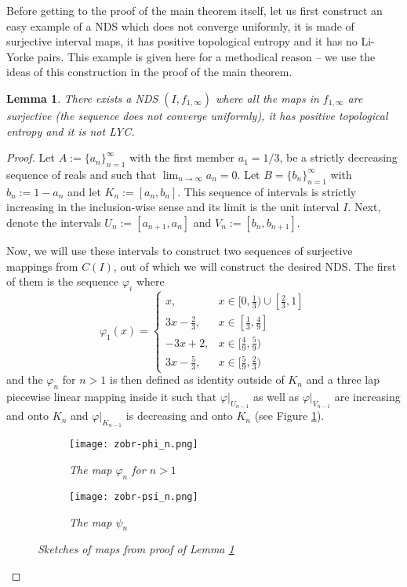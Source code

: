 \documentclass{amsart}
\newtheorem{lemma}{Lemma}
\begin{document}
Before getting to the proof of the main theorem itself, let us first construct an easy example of a NDS which does not converge uniformly, it is made of surjective interval maps, it has positive topological entropy and it has no Li-Yorke pairs. This example is given here for a methodical reason -- we use the ideas of this construction in the proof of the main theorem.

\begin{lemma}
\label{NonUnif}
There exists a NDS $(I,f_{1,\infty})$ where all the maps in $f_{1,\infty}$ are surjective (the sequence does not converge uniformly), it has positive topological entropy and it is not LYC.
\end{lemma}

\begin{proof}
Let $A := \{a_n\}_{n=1}^\infty$ with the first member $a_1 = 1/3$, be a strictly decreasing sequence of reals and such that $\lim_{n \rightarrow \infty} a_n = 0$. Let $B = \{b_n\}_{n=1}^\infty$ with $b_n:= 1-a_n$ and let $K_n := [a_n, b_n]$. This sequence of intervals is strictly increasing in the inclusion-wise sense and its limit is the unit interval $I$. Next, denote the intervals $U_n := [a_{n+1}, a_n]$ and $V_n := [b_n, b_{n+1}]$.

Now, we will use these intervals to construct two sequences of surjective mappings from $C(I)$, out of which we will construct the desired NDS. The first of them is the sequence $\varphi_i$ where
$$\varphi_1(x) = \left\{\begin{array}{rl} x, & x\in[0,\frac13)\cup[\frac23,1]\\ 3x-\frac23, & x\in[\frac13,\frac49]\\ -3x+2, & x\in [\frac49,\frac59)\\ 3x-\frac53, & x\in[\frac59,\frac23) \end{array} \right.$$
and the $\varphi_n$ for $n > 1$ is then defined as identity outside of $K_n$ and a three lap piecewise linear mapping inside it such that $\varphi|_{U_{n-1}}$ as well as $\varphi|_{V_{n-1}}$ are increasing and onto $K_n$ and $\varphi|_{K_{n-1}}$ is decreasing and onto $K_n$ (see Figure \ref{phin}).

\begin{figure}
\begin{subfigure}{.495\textwidth}
\centering
\texttt{[image: zobr-phi\_n.png]}
\caption{\sl The map $\varphi_n$ for $n>1$}
\label{phin}
\end{subfigure}
\begin{subfigure}{.495\textwidth}
\texttt{[image: zobr-psi\_n.png]}
\caption{\sl The map $\psi_n$}
\label{psin}
\end{subfigure}
\caption{\sl Sketches of maps from proof of Lemma \ref{NonUnif}}
\end{figure}


\end{proof}
\end{document}
